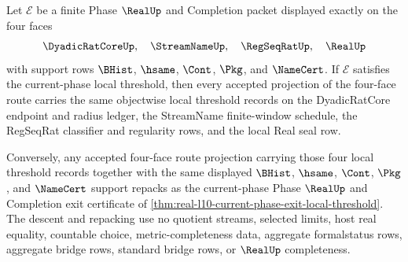 \begin{theorem}
\label{thm:real-l10-four-face-local-threshold-descent}
Let $\mathcal E$ be a finite Phase $\RealUp$ and Completion packet displayed exactly on the four faces
$$
\DyadicRatCoreUp,\quad \StreamNameUp,\quad \RegSeqRatUp,\quad \RealUp
$$
with support rows $\BHist$, $\hsame$, $\Cont$, $\Pkg$, and $\NameCert$. If $\mathcal E$ satisfies the current-phase local threshold, then every accepted projection of the four-face route carries the same objectwise local threshold records on the DyadicRatCore endpoint and radius ledger, the StreamName finite-window schedule, the RegSeqRat classifier and regularity rows, and the local Real seal row.

Conversely, any accepted four-face route projection carrying those four local threshold records together with the same displayed $\BHist$, $\hsame$, $\Cont$, $\Pkg$, and $\NameCert$ support repacks as the current-phase Phase $\RealUp$ and Completion exit certificate of \autoref{thm:real-l10-current-phase-exit-local-threshold}. The descent and repacking use no quotient streams, selected limits, host real equality, countable choice, metric-completeness data, aggregate formalstatus rows, aggregate bridge rows, standard bridge rows, or $\RealUp$ completeness.
\end{theorem}
